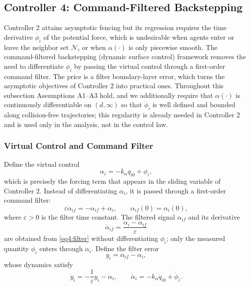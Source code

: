 \subsection{Controller 4: Command-Filtered Backstepping}
\label{sec: controller4}

Controller 2 attains asymptotic fencing but its regression requires the time derivative
$\dot{\phi}_i$ of the potential force, which is undesirable when agents enter or leave the
neighbor set $\mathcal{N}_i$ or when $\alpha(\cdot)$ is only piecewise smooth.
The command-filtered backstepping (dynamic surface control) framework
\cite{swaroopDynamicSurfaceControl2000,farrellCommandFilteredBackstepping2009}
removes the need to differentiate $\phi_i$ by passing the virtual control through a
first-order command filter. The price is a filter boundary-layer error, which turns the
asymptotic objectives of Controller 2 into practical ones.
Throughout this subsection Assumptions A1--A3 hold, and we additionally require that
$\alpha(\cdot)$ is continuously differentiable on $(d,\infty)$ so that $\dot{\phi}_i$ is well
defined and bounded along collision-free trajectories; this regularity is already needed in
Controller 2 and is used only in the analysis, not in the control law.

\subsubsection{Virtual Control and Command Filter}

Define the virtual control
\begin{equation}\label{eq4:virtual}
	\alpha_i = -k_\alpha q_{i0} + \phi_i,
\end{equation}
which is precisely the forcing term that appears in the sliding variable of Controller 2.
Instead of differentiating $\alpha_i$, it is passed through a first-order command filter:
\begin{equation}\label{eq4:filter}
	\varepsilon\dot{\alpha}_{if} = -\alpha_{if} + \alpha_i,\qquad
	\alpha_{if}(0) = \alpha_i(0),
\end{equation}
where $\varepsilon > 0$ is the filter time constant. The filtered signal $\alpha_{if}$ and
its derivative
\begin{equation}\label{eq4:filter_der}
	\dot{\alpha}_{if} = \frac{\alpha_i - \alpha_{if}}{\varepsilon}
\end{equation}
are obtained from \eqref{eq4:filter} without differentiating $\phi_i$; only the measured
quantity $\phi_i$ enters through $\alpha_i$. Define the filter error
\begin{equation}\label{eq4:filter_err}
	y_i = \alpha_{if} - \alpha_i,
\end{equation}
whose dynamics satisfy
\begin{equation}\label{eq4:y_dot}
	\dot{y}_i = -\frac{1}{\varepsilon}y_i - \dot{\alpha}_i,\qquad
	\dot{\alpha}_i = -k_\alpha \dot{q}_{i0} + \dot{\phi}_i.
\end{equation}

